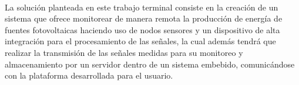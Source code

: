 \paragraph{}
La solución planteada en este trabajo terminal consiste en la creación de un sistema que ofrece monitorear de manera remota la producción de energía de fuentes fotovoltaicas haciendo uso de nodos sensores y un dispositivo de alta integración para el procesamiento de las señales, la cual además tendrá que realizar la transmisión de las señales medidas para su monitoreo y almacenamiento por un servidor dentro de un sistema embebido, comunicándose con la plataforma desarrollada para el usuario.
